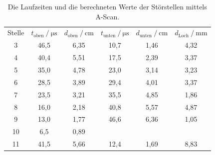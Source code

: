 \begin{table}[H]
  \centering
  \caption{Die Laufzeiten und die berechneten Werte der Störstellen mittels A-Scan.}
  \label{tab:tiefenmessung}
  \begin{tabular}{c c c c c c}
    \toprule
    \multicolumn{1}{c}{Stelle} &
    \multicolumn{1}{c}{$t_\text{oben} \mathbin{/} \unit{\micro\second}$} &
    \multicolumn{1}{c}{$d_\text{oben} \mathbin{/} \unit{\centi\meter}$} &
    \multicolumn{1}{c}{$t_\text{unten} \mathbin{/} \unit{\micro\second}$} &
    \multicolumn{1}{c}{$d_\text{unten} \mathbin{/} \unit{\centi\meter}$} &
    \multicolumn{1}{c}{$d_\text{Loch} \mathbin{/} \unit{\milli\meter}$} \\

    \cmidrule(lr){1-1} \cmidrule(lr){2-3} \cmidrule(lr){4-5} \cmidrule(lr){6-6} 
    
          3 &    46,5 &    6,35 &     10,7 &     1,46 &    4,32 \\
          4 &    40,4 &    5,51 &     17,5 &     2,39 &    3,37 \\
          5 &    35,0 &    4,78 &     23,0 &     3,14 &    3,23 \\
          6 &    28,5 &    3,89 &     29,4 &     4,01 &    3,37 \\
          7 &    23,5 &    3,21 &     35,5 &     4,85 &    1,86 \\
          8 &    16,0 &    2,18 &     40,8 &     5,57 &    4,87 \\
          9 &    13,0 &    1,77 &     46,6 &     6,36 &    1,05 \\
         10 &     6,5 &    0,89 &          &          &         \\
         11 &    41,5 &    5,66 &     12,4 &     1,69 &    8,83 \\
    \bottomrule
  \end{tabular}
\end{table}

